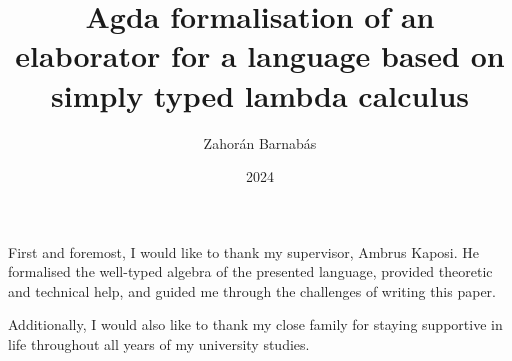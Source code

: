 \documentclass[
]{elteikthesis}[2023/04/10]
\title{Agda formalisation of an elaborator for a language based on simply typed lambda calculus} %
\date{2024} %
\author{Zahorán Barnabás}
\affiliation{Docent} %
\begin{document}


\maketitle
%

\tableofcontents
\cleardoublepage


\cleardoublepage


\cleardoublepage


\cleardoublepage


\cleardoublepage


\cleardoublepage

\chapter*{\acklabel}
First and foremost, I would like to thank my supervisor, Ambrus Kaposi. He formalised the well-typed algebra of the presented language, provided theoretic and technical help, and guided me through the challenges of writing this paper.

Additionally, I would also like to thank my close family for staying supportive in life throughout all years of my university studies.

%

{}
\printbibliography[title=\biblabel]
\cleardoublepage




{}
\lstlistoflistings
\cleardoublepage

\printnomenclature
\end{document}
